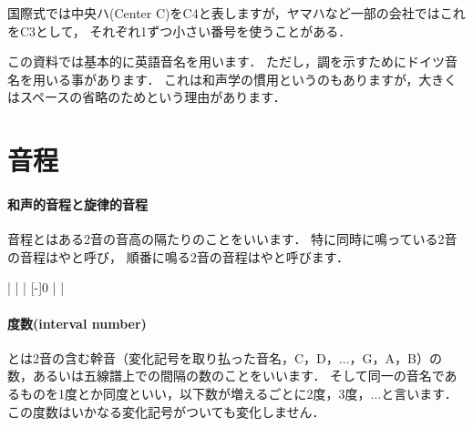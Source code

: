 \documentclass[dvipdfmx,uplatex,b5paper,openany,jbase=12Q,nomag*,textwidth-limit=44%
               ]{gachimuchi}[2020/05/05]
\begin{document}
\begin{chuui}
国際式では中央ハ(Center C)をC4と表しますが，ヤマハなど一部の会社ではこれをC3として，
それぞれ1ずつ小さい番号を使うことがある．
\end{chuui}

この資料では基本的に英語音名を用います．
ただし，調を示すためにドイツ音名を用いる事があります．
これは和声学の慣用というのもありますが，大きくはスペースの省略のためという理由があります．

\section{音程}
\paragraph{和声的音程と旋律的音程}
音程とはある2音の音高の隔たりのことをいいます．
特に同時に鳴っている2音の音程はやと呼び，
順番に鳴る2音の音程はやと呼びます．

\begin{Music}
  \nostartrule%
  \Startpiece%
  \NOtes{}%
  \en\bar%
  \NOTes%
  \en\NOtes%
  \en\bar%
  \NOTes%
  \en\bar%
  \NOTEs%
  \en\setdoublebar
  \endpiece%
  \Startpiece%
  \NOtesp{}%
  \en\Notes%
  \en\NOtes%
  [-\QNwidth]{0}%
  \en\bar%
  \NOtes%
  \en\bar%
  \NOTes%
  \Mryaku\sk%
  \en\setdoublebar
  \endpiece%
\end{Music}


\paragraph{度数(interval number)}
とは2音の含む幹音（変化記号を取り払った音名，C，D，$\dots$，G，A，B）の数，あるいは五線譜上での間隔の数のことをいいます．
そして同一の音名であるものを1度とか同度といい，以下数が増えるごとに2度，3度，$\dots$と言います．
この度数はいかなる変化記号がついても変化しません．
\end{document}
